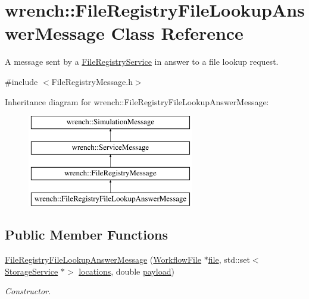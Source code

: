 \hypertarget{classwrench_1_1_file_registry_file_lookup_answer_message}{}\section{wrench\+:\+:File\+Registry\+File\+Lookup\+Answer\+Message Class Reference}
\label{classwrench_1_1_file_registry_file_lookup_answer_message}


A message sent by a \hyperlink{classwrench_1_1_file_registry_service}{File\+Registry\+Service} in answer to a file lookup request.  




{\ttfamily \#include $<$File\+Registry\+Message.\+h$>$}

Inheritance diagram for wrench\+:\+:File\+Registry\+File\+Lookup\+Answer\+Message\+:\begin{figure}[H]
\begin{center}
\leavevmode
\includegraphics[height=4.000000cm]{classwrench_1_1_file_registry_file_lookup_answer_message}
\end{center}
\end{figure}
\subsection*{Public Member Functions}
\begin{DoxyCompactItemize}
\item 
\hyperlink{classwrench_1_1_file_registry_file_lookup_answer_message_a9abff1af63bffdad71309cce9366fdf8}{File\+Registry\+File\+Lookup\+Answer\+Message} (\hyperlink{classwrench_1_1_workflow_file}{Workflow\+File} $\ast$\hyperlink{classwrench_1_1_file_registry_file_lookup_answer_message_a7d2ce0c6eb0b7d89df8d4cb4605c9975}{file}, std\+::set$<$ \hyperlink{classwrench_1_1_storage_service}{Storage\+Service} $\ast$$>$ \hyperlink{classwrench_1_1_file_registry_file_lookup_answer_message_a1ec08876bc0a43b9722065d2eeaba4d5}{locations}, double \hyperlink{classwrench_1_1_simulation_message_a914f2732713f7c02898e66f05a7cb8a1}{payload})
\begin{DoxyCompactList}\small\item\em Constructor. \end{DoxyCompactList}\end{DoxyCompactItemize}
